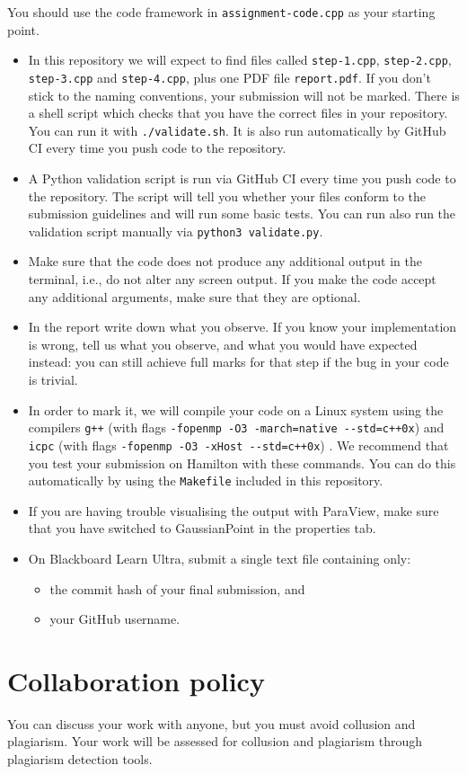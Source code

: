 \documentclass[11pt,a4paper,DIV=12,pdftex]{scrartcl}
\begin{document}
You should use the code framework in \verb#assignment-code.cpp# as your starting point.
\begin{itemize}
\item In this repository we will expect to find files called \verb#step-1.cpp#, \verb#step-2.cpp#, \verb#step-3.cpp# and \verb#step-4.cpp#, plus one PDF file \verb#report.pdf#. If you don’t stick to the naming conventions, your submission will not be marked. There is a shell script which checks that you have the correct files in your repository. You can run it with \verb=./validate.sh=. It is also run automatically by GitHub CI every time you push code to the repository.

\item A Python validation script is run via GitHub CI every time you push code to the repository. The script will tell you whether your files conform to the submission guidelines and will run some basic tests. You can run also run the validation script manually via \verb#python3 validate.py#.

\item Make sure that the code does not produce any additional output in the terminal, i.e., do not alter any screen output. If you make the code accept any additional arguments, make sure that they are optional.

\item In the report write down what you observe. If you know your implementation is wrong, tell us what you observe, and what you would have expected instead: you can still achieve full marks for that step if the bug in your code is trivial.

\item In order to mark it, we will compile your code on a Linux system using the compilers \verb#g++# (with flags \verb#-fopenmp -O3 -march=native --std=c++0x#) and \verb#icpc# (with flags \verb#-fopenmp -O3 -xHost --std=c++0x#) . We recommend that you test your submission on Hamilton with these commands. You can do this automatically by using the \verb#Makefile# included in this repository.

\goodbreak

\item If you are having trouble visualising the output with ParaView, make sure that you have switched to GaussianPoint in the properties tab.

\item On Blackboard Learn Ultra, submit a single text file containing only:
  \begin{itemize}
  \item the commit hash of your final submission, and
  \item your GitHub username.
  \end{itemize}
\end{itemize}

\section*{Collaboration policy}
You can discuss your work with anyone, but you must avoid collusion and plagiarism. Your work will be assessed for collusion and plagiarism through plagiarism detection tools.
\end{document}
